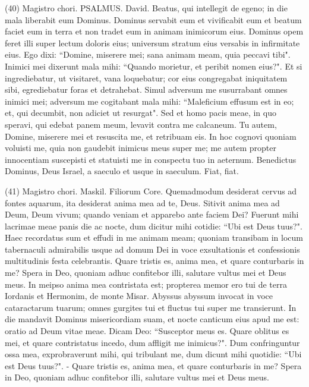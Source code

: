\begin{biblechapter}  (40) 
\verse  Magistro chori. PSALMUS. David. 
\verse Beatus, qui intellegit de egeno; in die mala liberabit eum Dominus. 
\verse Dominus servabit eum et vivificabit eum et beatum faciet eum in terra et non tradet eum in animam inimicorum eius. 
\verse Dominus opem feret illi super lectum doloris eius; universum stratum eius versabis in infirmitate eius. 
\verse Ego dixi: “Domine, miserere mei; sana animam meam, quia peccavi tibi". 
\verse Inimici mei dixerunt mala mihi: “Quando morietur, et peribit nomen eius?". 
\verse Et si ingrediebatur, ut visitaret, vana loquebatur; cor eius congregabat iniquitatem sibi, egrediebatur foras et detrahebat. 
\verse Simul adversum me susurrabant omnes inimici mei; adversum me cogitabant mala mihi: 
\verse “Maleficium effusum est in eo; et, qui decumbit, non adiciet ut resurgat". 
\verse Sed et homo pacis meae, in quo speravi, qui edebat panem meum, levavit contra me calcaneum. 
\verse Tu autem, Domine, miserere mei et resuscita me, et retribuam eis. 
\verse In hoc cognovi quoniam voluisti me, quia non gaudebit inimicus meus super me; 
\verse me autem propter innocentiam suscepisti et statuisti me in conspectu tuo in aeternum. 
\verse Benedictus Dominus, Deus Israel, a saeculo et usque in saeculum. Fiat, fiat. 
\end{biblechapter}

\begin{biblechapter}  
\end{biblechapter}

\begin{biblechapter}  (41) 
\verse  Magistro chori. Maskil. Filiorum Core. 
\verse Quemadmodum desiderat cervus ad fontes aquarum, ita desiderat anima mea ad te, Deus. 
\verse Sitivit anima mea ad Deum, Deum vivum; quando veniam et apparebo ante faciem Dei? 
\verse Fuerunt mihi lacrimae meae panis die ac nocte, dum dicitur mihi cotidie: “Ubi est Deus tuus?". 
\verse Haec recordatus sum et effudi in me animam meam; quoniam transibam in locum tabernaculi admirabilis usque ad domum Dei in voce exsultationis et confessionis multitudinis festa celebrantis. 
\verse Quare tristis es, anima mea, et quare conturbaris in me? Spera in Deo, quoniam adhuc confitebor illi, salutare vultus mei et Deus meus. 
\verse In meipso anima mea contristata est; propterea memor ero tui de terra Iordanis et Hermonim, de monte Misar. 
\verse Abyssus abyssum invocat in voce cataractarum tuarum; omnes gurgites tui et fluctus tui super me transierunt. 
\verse In die mandavit Dominus misericordiam suam, et nocte canticum eius apud me est: oratio ad Deum vitae meae. 
\verse Dicam Deo: “Susceptor meus es. Quare oblitus es mei, et quare contristatus incedo, dum affligit me inimicus?". 
\verse Dum confringuntur ossa mea, exprobraverunt mihi, qui tribulant me, dum dicunt mihi quotidie: “Ubi est Deus tuus?". - 
\verse Quare tristis es, anima mea, et quare conturbaris in me? Spera in Deo, quoniam adhuc confitebor illi, salutare vultus mei et Deus meus. 
\end{biblechapter}

